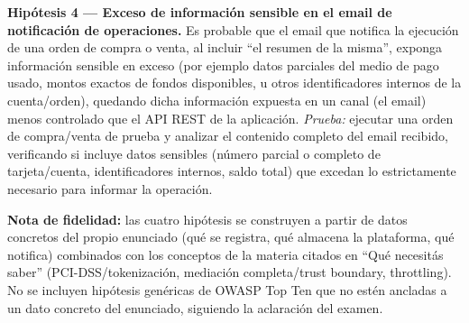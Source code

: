 \textbf{Hipótesis 4 --- Exceso de información sensible en el email de notificación de
operaciones.} Es probable que el email que notifica la ejecución de una orden de compra
o venta, al incluir ``el resumen de la misma'', exponga información sensible en exceso
(por ejemplo datos parciales del medio de pago usado, montos exactos de fondos
disponibles, u otros identificadores internos de la cuenta/orden), quedando dicha
información expuesta en un canal (el email) menos controlado que el API REST de la
aplicación.
\emph{Prueba:} ejecutar una orden de compra/venta de prueba y analizar el contenido
completo del email recibido, verificando si incluye datos sensibles (número parcial o
completo de tarjeta/cuenta, identificadores internos, saldo total) que excedan lo
estrictamente necesario para informar la operación.

\medskip
\noindent\textbf{Nota de fidelidad:} las cuatro hipótesis se construyen a partir de
datos concretos del propio enunciado (qué se registra, qué almacena la plataforma, qué
notifica) combinados con los conceptos de la materia citados en ``Qué necesitás saber''
(PCI-DSS/tokenización, mediación completa/trust boundary, throttling). No se incluyen
hipótesis genéricas de OWASP Top Ten que no estén ancladas a un dato concreto del
enunciado, siguiendo la aclaración del examen.

